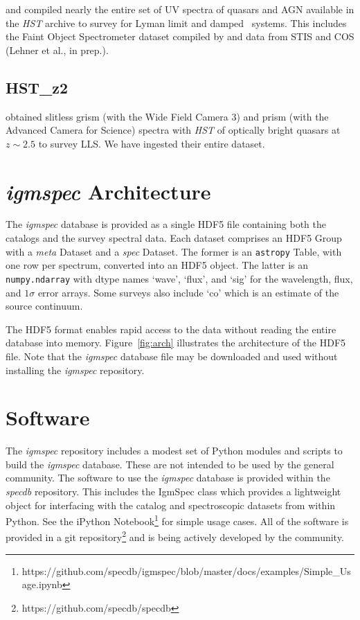 \documentclass[12pt]{elsarticle}
\begin{document}
\cite{ribaudo11} and \cite{neeleman+16}
compiled nearly the entire set of UV spectra of 
quasars and AGN available in the {\it HST} archive
to survey for Lyman limit and damped \lya\ systems.
This includes the Faint Object Spectrometer dataset
compiled by \cite{bechtold02} and data from STIS
and COS (Lehner et al., in prep.).

\subsection{HST\_z2}
\label{sec:hstz2}

\cite{omeara11,omeara13} obtained slitless grism
(with the Wide Field Camera 3) and prism (with the
Advanced Camera for Science) spectra with {\it HST}
of optically bright quasars at $z \sim 2.5$
to survey LLS.  We have ingested their entire dataset.

\section{{\it igmspec} Architecture}
\label{sec:arch}

The {\it igmspec} database is provided as a single HDF5 file
containing both the catalogs and the survey spectral data.  
Each dataset comprises an HDF5 Group
with a {\it meta} Dataset and a {\it spec} Dataset.
The former is an {\tt astropy} Table, with one row per
spectrum, converted into an HDF5 object.
The latter is an {\tt numpy.ndarray} 
with dtype names `wave', `flux', and `sig' for the
wavelength, flux, and $1\sigma$ error arrays.
Some surveys also include `co' which is an estimate of the source
continuum.  

The HDF5 format enables rapid access to the data without
reading the entire database into memory.  
Figure~\ref{fig:arch} illustrates the 
architecture of the HDF5 file.
Note that the {\it igmspec} database file may be
downloaded and used without installing the {\it igmspec}
repository.


\section{Software}
\label{sec:software}

The {\it igmspec} repository includes 
a modest set of Python modules and scripts to build the
{\it igmspec} database.  
These are not intended to be used by the general community.
The software to use the {\it igmspec}
database is provided within the {\it specdb} repository.
This includes the
IgmSpec class which provides a lightweight object for
interfacing with the catalog and spectroscopic datasets
from within Python.  See the iPython Notebook\footnote{
https://github.com/specdb/igmspec/blob/master/docs/examples/Simple\_Usage.ipynb}
for simple usage cases.
All of the software is provided in a git repository\footnote{
https://github.com/specdb/specdb}
and is being actively developed by the community.
\end{document}
